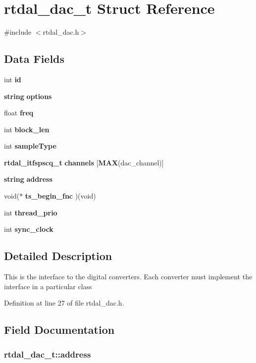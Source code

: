 \section{rtdal\-\_\-dac\-\_\-t Struct Reference}
\label{structrtdal__dac__t}


{\ttfamily \#include $<$rtdal\-\_\-dac.\-h$>$}

\subsection*{Data Fields}
\begin{DoxyCompactItemize}
\item 
int {\bf id}
\item 
{\bf string} {\bf options}
\item 
float {\bf freq}
\item 
int {\bf block\-\_\-len}
\item 
int {\bf sample\-Type}
\item 
{\bf rtdal\-\_\-itfspscq\-\_\-t} {\bf channels} [{\bf M\-A\-X}(dac\-\_\-channel)]
\item 
{\bf string} {\bf address}
\item 
void($\ast$ {\bf ts\-\_\-begin\-\_\-fnc} )(void)
\item 
int {\bf thread\-\_\-prio}
\item 
int {\bf sync\-\_\-clock}
\end{DoxyCompactItemize}


\subsection{Detailed Description}
This is the interface to the digital converters. Each converter must implement the interface in a particular class 

Definition at line 27 of file rtdal\-\_\-dac.\-h.



\subsection{Field Documentation}
\subsubsection[{address}]{ rtdal\-\_\-dac\-\_\-t\-::address}\label{structrtdal__dac__t_a61aaedfb5e9406837a83cfa0a57668bc}



